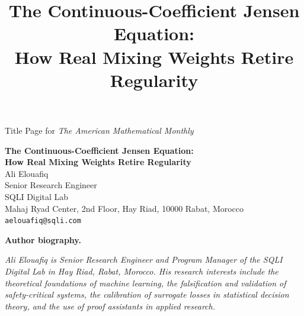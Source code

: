 \documentclass{article}
\theoremstyle{plain}
\theoremstyle{definition}
\begin{document}
\begin{center}
{\LARGE{Title Page for \textit{The American Mathematical Monthly}}}
\end{center}

\vspace{100px}
\begin{center}
\textbf{\large The Continuous-Coefficient Jensen Equation:} \\
\textbf{\large How Real Mixing Weights Retire Regularity} \\
\vspace{30px}
Ali Elouafiq \\
Senior Research Engineer \\
SQLI Digital Lab \\
Mahaj Ryad Center, 2nd Floor, Hay Riad, 10000 Rabat, Morocco \\
\texttt{aelouafiq@sqli.com}
\end{center}

\vspace{20px}
\begin{center}
\textbf{Author biography.}
\begin{minipage}{0.85\linewidth}
\small\itshape
Ali Elouafiq is Senior Research Engineer and Program Manager of the
SQLI Digital Lab in Hay Riad, Rabat, Morocco. His research interests
include the theoretical foundations of machine learning, the
falsification and validation of safety-critical systems, the
calibration of surrogate losses in statistical decision theory, and
the use of proof assistants in applied research.
\end{minipage}
\end{center}

\pagebreak


\title{The Continuous-Coefficient Jensen Equation:\\
       How Real Mixing Weights Retire Regularity}

\end{document}
